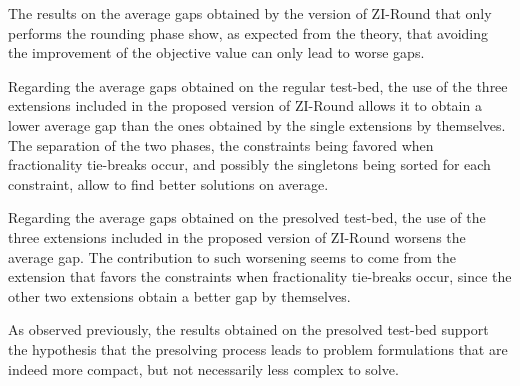 \documentclass[a4paper,12pt]{book}
\begin{document}
The results on the average gaps obtained by the version of ZI-Round that only performs the rounding phase show, as expected from the theory, that avoiding the improvement of the objective value can only lead to worse gaps. \par 

Regarding the average gaps obtained on the regular test-bed, the use of the three extensions included in the proposed version of ZI-Round allows it to obtain a lower average gap than the ones obtained by the single extensions by themselves. The separation of the two phases, the constraints being favored when fractionality tie-breaks occur, and possibly the singletons being sorted for each constraint, allow to find better solutions on average. \par 

Regarding the average gaps obtained on the presolved test-bed, the use of the three extensions included in the proposed version of ZI-Round worsens the average gap. The contribution to such worsening seems to come from the extension that favors the constraints when fractionality tie-breaks occur, since the other two extensions obtain a better gap by themselves. \par 

As observed previously, the results obtained on the presolved test-bed support the hypothesis that the presolving process leads to problem formulations that are indeed more compact, but not necessarily less complex to solve.
\end{document}
